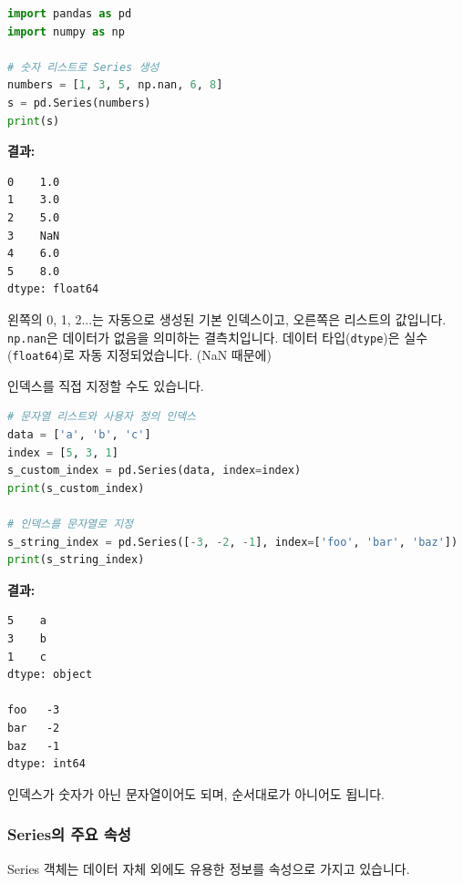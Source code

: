 \documentclass[11pt,a4paper]{book}
\theoremstyle{definition}
\begin{document}
\begin{codeexamplebox}
\begin{lstlisting}[language=Python, caption={파이썬 리스트로 Series 생성}, label={lst:series_from_list}, breaklines=true]
import pandas as pd
import numpy as np

# 숫자 리스트로 Series 생성
numbers = [1, 3, 5, np.nan, 6, 8]
s = pd.Series(numbers)
print(s)
\end{lstlisting}
\textbf{결과:}
\begin{verbatim}
0    1.0
1    3.0
2    5.0
3    NaN
4    6.0
5    8.0
dtype: float64
\end{verbatim}
왼쪽의 0, 1, 2...는 자동으로 생성된 기본 인덱스이고, 오른쪽은 리스트의 값입니다. \texttt{np.nan}은 데이터가 없음을 의미하는 결측치입니다. 데이터 타입(\texttt{dtype})은 실수(\texttt{float64})로 자동 지정되었습니다. (NaN 때문에)
\end{codeexamplebox}

인덱스를 직접 지정할 수도 있습니다.

\begin{codeexamplebox}
\begin{lstlisting}[language=Python, caption={인덱스를 지정하여 Series 생성}, label={lst:series_with_index}, breaklines=true]
# 문자열 리스트와 사용자 정의 인덱스
data = ['a', 'b', 'c']
index = [5, 3, 1]
s_custom_index = pd.Series(data, index=index)
print(s_custom_index)

# 인덱스를 문자열로 지정
s_string_index = pd.Series([-3, -2, -1], index=['foo', 'bar', 'baz'])
print(s_string_index)
\end{lstlisting}
\textbf{결과:}
\begin{verbatim}
5    a
3    b
1    c
dtype: object

foo   -3
bar   -2
baz   -1
dtype: int64
\end{verbatim}
인덱스가 숫자가 아닌 문자열이어도 되며, 순서대로가 아니어도 됩니다.
\end{codeexamplebox}

\subsubsection{Series의 주요 속성}

Series 객체는 데이터 자체 외에도 유용한 정보를 속성으로 가지고 있습니다.
\end{document}
